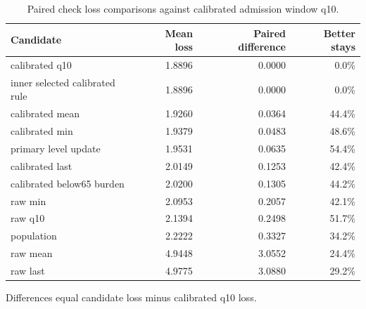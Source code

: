 \begin{table}[!htbp]
\caption{Paired check loss comparisons against calibrated admission window q10.}
\label{tab:validation_extension_paired_comparisons}
\centering
\small
\begin{tabular}{lrrr}
\hline
Candidate & Mean loss & Paired difference & Better stays\\
\hline
calibrated q10 & 1.8896 & 0.0000 & 0.0\%\\
inner selected calibrated rule & 1.8896 & 0.0000 & 0.0\%\\
calibrated mean & 1.9260 & 0.0364 & 44.4\%\\
calibrated min & 1.9379 & 0.0483 & 48.6\%\\
primary level update & 1.9531 & 0.0635 & 54.4\%\\
calibrated last & 2.0149 & 0.1253 & 42.4\%\\
calibrated below65 burden & 2.0200 & 0.1305 & 44.2\%\\
raw min & 2.0953 & 0.2057 & 42.1\%\\
raw q10 & 2.1394 & 0.2498 & 51.7\%\\
population & 2.2222 & 0.3327 & 34.2\%\\
raw mean & 4.9448 & 3.0552 & 24.4\%\\
raw last & 4.9775 & 3.0880 & 29.2\%\\
\hline
\end{tabular}
\par\smallskip
\footnotesize{Differences equal candidate loss minus calibrated q10 loss.}
\end{table}
